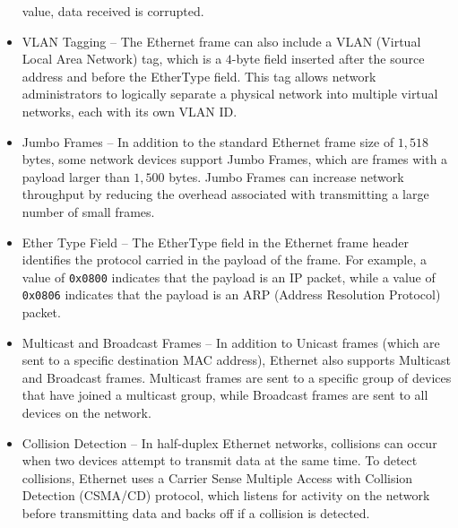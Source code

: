 \documentclass{article}
\begin{document}
\begin{itemize}
  value, data received is corrupted.  
\item VLAN Tagging – The Ethernet frame can also include a VLAN
  (Virtual Local Area Network) tag, which is a $4$-byte field inserted
  after the source address and before the EtherType field. This tag
  allows network administrators to logically separate a physical
  network into multiple virtual networks, each with its own VLAN ID.  
\item Jumbo Frames – In addition to the standard Ethernet frame size
  of $1,518$ bytes, some network devices support Jumbo Frames, which are
  frames with a payload larger than $1,500$ bytes. Jumbo Frames can
  increase network throughput by reducing the overhead associated with
  transmitting a large number of small frames.  
\item Ether Type Field – The EtherType field in the Ethernet frame
  header identifies the protocol carried in the payload of the
  frame. For example, a value of \verb!0x0800! indicates that the payload is
  an IP packet, while a value of \verb!0x0806! indicates that the payload is
  an ARP (Address Resolution Protocol) packet.  
\item Multicast and Broadcast Frames –  In addition to Unicast frames
  (which are sent to a specific destination MAC address), Ethernet
  also supports Multicast and Broadcast frames. Multicast frames are
  sent to a specific group of devices that have joined a multicast
  group, while Broadcast frames are sent to all devices on the
  network.  
\item Collision Detection – In half-duplex Ethernet networks,
  collisions can occur when two devices attempt to transmit data at
  the same time. To detect collisions, Ethernet uses a Carrier Sense
  Multiple Access with Collision Detection (CSMA/CD) protocol, which
  listens for activity on the network before transmitting data and
  backs off if a collision is detected.
\end{itemize}
  









\end{document}
